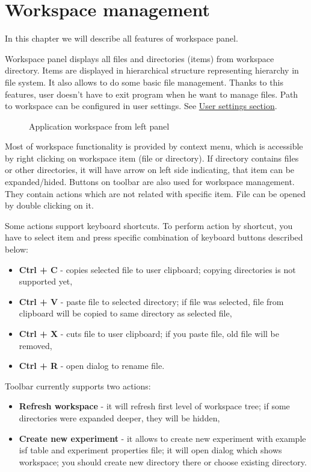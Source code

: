 \section{Workspace management}\label{section:workspace}

In this chapter we will describe all features of workspace panel.

Workspace panel displays all files and directories (items) from workspace directory. Items are displayed in hierarchical structure representing hierarchy in file system. It also allows to do some basic file management. Thanks to this features, user doesn't have to exit program when he want to manage files. Path to workspace can be configured in user settings. See \hyperref[section:user-settings]{User settings section}.

\begin{figure*}[!ht] 
	\centering
	\caption{Application workspace from left panel}
\end{figure*}

Most of workspace functionality is provided by context menu, which is accessible by right clicking on workspace item (file or directory). If directory contains files or other directories, it will have arrow on left side indicating, that item can be expanded/hided. Buttons on toolbar are also used for workspace management. They contain actions which are not related with specific item. File can be opened by double clicking on it.

Some actions support keyboard shortcuts. To perform action by shortcut, you have to select item and press specific combination of keyboard buttons described below:
\begin{itemize}
	\item \textbf{Ctrl + C} - copies selected file to user clipboard; copying directories is not supported yet,
	\item \textbf{Ctrl + V} - paste file to selected directory; if file was selected, file from clipboard will be copied to same directory as selected file,
	\item \textbf{Ctrl + X} - cuts file to user clipboard; if you paste file, old file will be removed,
	\item \textbf{Ctrl + R} - open dialog to rename file.
\end{itemize}


Toolbar currently supports two actions:

\begin{itemize}
	\item \textbf{Refresh workspace} - it will refresh first level of workspace tree; if some directories were expanded deeper, they will be hidden,
	\item \textbf{Create new experiment} - it allows to create new experiment with example isf table and experiment properties file; it will open dialog which shows workspace; you should create new directory there or choose existing directory.
\end{itemize}


